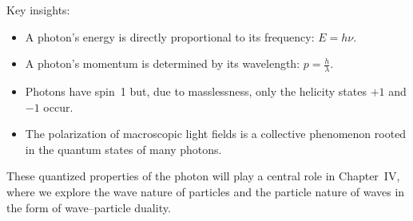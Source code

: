 \vspace{0.5em}
Key insights:
\begin{itemize}
	\item A photon’s energy is directly proportional to its frequency: \( E = h\nu \).
	\item A photon’s momentum is determined by its wavelength: \( p = \tfrac{h}{\lambda} \).
	\item Photons have spin~1 but, due to masslessness, only the helicity states $+1$ and $-1$ occur.
	\item The polarization of macroscopic light fields is a collective phenomenon rooted in the quantum states of many photons.
\end{itemize}

\vspace{0.5em}
These quantized properties of the photon will play a central role in Chapter~IV, where we explore the wave nature of particles and the particle nature of waves in the form of wave–particle duality.
